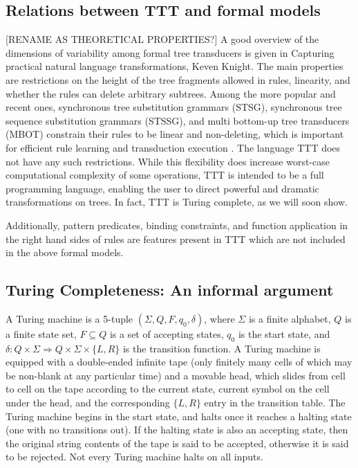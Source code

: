 \documentclass[11pt]{article}
\begin{document}
\subsection*{Relations between TTT and formal models} 
[RENAME AS THEORETICAL PROPERTIES?]
A good overview of the dimensions of variability among formal tree transducers is given in Capturing practical natural language transformations, Keven Knight.  The main properties are restrictions on the height of the tree fragments allowed in rules, linearity, and whether the rules can delete arbitrary subtrees.  Among the more popular and recent ones, synchronous tree substitution grammars (STSG), synchronous tree sequence substitution grammars (STSSG), and multi bottom-up tree transducers (MBOT)  constrain their rules to be linear and non-deleting, which is important for efficient rule learning and transduction execution \cite{Chiang:2004,Galley:2004,Yamada-Knight:2001,Zhang:2008,Maletti:2010}.  The language TTT does not have any such restrictions.  While this flexibility does increase worst-case computational complexity of some operations, TTT is intended to be a full programming language, enabling the user to direct powerful and dramatic transformations on trees. In fact, TTT is Turing complete, as we will soon show. 

Additionally, pattern predicates, binding constraints, and function application in the right hand sides of rules are features present in TTT which are not included in the above formal models.

\subsection*{Turing Completeness: An informal argument}
A Turing machine is a 5-tuple $(\Sigma,Q,F,q_0,\delta)$, where $\Sigma$ is a finite alphabet, $Q$ is a finite state set, $F \subseteq Q$ is a set of accepting states, $q_0$ is the start state, and $\delta : Q \times \Sigma \Rightarrow Q \times \Sigma \times \{L,R\}$ is the transition function.  A Turing machine is equipped with a double-ended infinite tape (only finitely many cells of which may be non-blank at any particular time) and a movable head, which slides from cell to cell on the tape according to the current state, current symbol on the cell under the head, and the corresponding $\{L,R\}$ entry in the transition table.  The Turing machine begins in the start state, and halts once it reaches a halting state (one with no transitions out). If the halting state is also an accepting state, then the original string contents of the tape is said to be accepted, otherwise it is said to be rejected.  Not every Turing machine halts on all inputs. 
\end{document}
